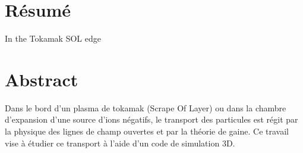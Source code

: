 \thispagestyle{empty}
\cleardoublepage
\thispagestyle{preface}	
	\section*{Résumé}
		In the Tokamak SOL edge
	\section*{Abstract}
		Dans le bord d'un plasma de tokamak (Scrape Of Layer) 
		ou dans la chambre d'expansion d'une source d'ions négatifs,
		le transport des particules est régit par la physique des
		lignes de champ ouvertes et par la théorie de gaine.
		Ce travail vise à étudier ce transport à l'aide d'un code 
		de simulation 3D.